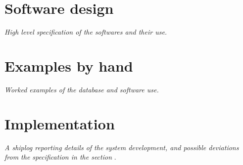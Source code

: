 \documentclass[a4paper,10pt]{article}
\begin{document}
%
%
%
%

\section{Software design}
\label{sec:design}

{\em High level specification of the softwares and their use.}

\section{Examples by hand}
\label{sec:by_hand}

{\em Worked examples of the database and software use.}

\section{Implementation}
\label{sec:impl}

{\em A shiplog reporting details of the system development, and
possible deviations from the specification in the section
}.
\end{document}

